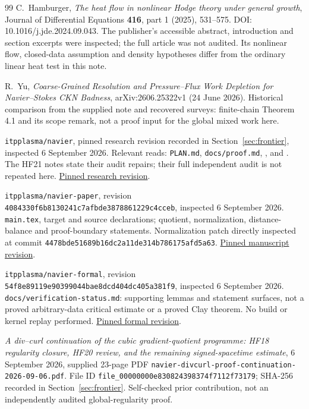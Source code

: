 \documentclass[11pt,a4paper]{article}
\theoremstyle{definition}
\theoremstyle{remark}
\newcommand{\repo}[1]{{\small\texttt{#1}}}
\numberwithin{equation}{section}
\begin{document}
\begin{thebibliography}{99}
C.~Hamburger, \emph{The heat flow in nonlinear Hodge theory under general growth}, Journal of Differential Equations \textbf{416}, part 1 (2025), 531--575. DOI: 10.1016/j.jde.2024.09.043. The publisher's accessible abstract, introduction and section excerpts were inspected; the full article was not audited. Its nonlinear flow, closed-data assumption and density hypotheses differ from the ordinary linear heat test in this note.

R.~Yu, \emph{Coarse-Grained Resolution and Pressure--Flux Work Depletion for Navier--Stokes CKN Badness}, arXiv:2606.25322v1 (24 June 2026). Historical comparison from the supplied note and recovered surveys: finite-chain Theorem 4.1 and its scope remark, not a proof input for the global mixed work here.

\repo{itpplasma/navier}, pinned research revision recorded in Section~\ref{sec:frontier}, inspected 6 September 2026. Relevant reads: \repo{PLAN.md}, \repo{docs/proof.md}, , and . The HF21 notes state their audit repairs; their full independent audit is not repeated here. \href{https://github.com/itpplasma/navier/tree/b711149aea11d6147c9144fb5431eca4dc1d83af}{Pinned research revision}.

\repo{itpplasma/navier-paper}, revision \repo{4084330f6b8130241c7afbde3878861229c4cceb}, inspected 6 September 2026. \repo{main.tex}, target and source declarations; quotient, normalization, distance-balance and proof-boundary statements. Normalization patch directly inspected at commit \repo{4478bde51689b16dc2a11de314b786175afd5a63}. \href{https://github.com/itpplasma/navier-paper/tree/4084330f6b8130241c7afbde3878861229c4cceb}{Pinned manuscript revision}.

\repo{itpplasma/navier-formal}, revision \repo{54f8e89119e90399044bae8dcd404dc405a381f9}, inspected 6 September 2026. \repo{docs/verification-status.md}: supporting lemmas and statement surfaces, not a proved arbitrary-data critical estimate or a proved Clay theorem. No build or kernel replay performed. \href{https://github.com/itpplasma/navier-formal/tree/54f8e89119e90399044bae8dcd404dc405a381f9}{Pinned formal revision}.

\emph{A div--curl continuation of the cubic gradient-quotient programme: HF18 regularity closure, HF20 review, and the remaining signed-spacetime estimate}, 6 September 2026, supplied 23-page PDF \repo{navier-divcurl-proof-continuation-2026-09-06.pdf}. File ID \repo{file\_00000000e830824398374f7112f73179}; SHA-256 recorded in Section~\ref{sec:frontier}. Self-checked prior contribution, not an independently audited global-regularity proof.


\end{thebibliography}
\end{document}
